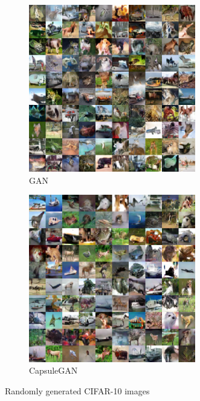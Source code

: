 \begin{figure}
\centering
\begin{subfigure}{.49\textwidth}
\centering
\includegraphics[width=0.8\textwidth]{img/gan_cifar10_randomly_generated.png}
\caption{GAN}
\label{fig:gan_cifar10_randomly_generated}
\end{subfigure}
\begin{subfigure}{.49\textwidth}
\centering
\includegraphics[width=0.8\textwidth]{img/capsgan_cifar10_randomly_generated.png}
\caption{CapsuleGAN}
\label{fig:capsgan_cifar10_randomly_generated}
\end{subfigure}
\label{fig:cifar10_randomly_generated}
\caption{Randomly generated CIFAR-10 images}
\end{figure}

